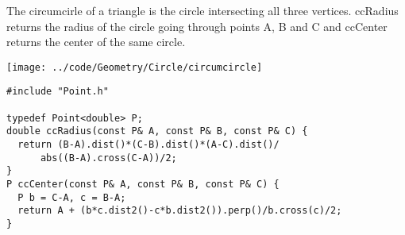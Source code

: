 \begin{minipage}{75mm}
The circumcirle of a triangle is the circle intersecting all three vertices. ccRadius returns the radius of the circle going through points A, B and C and ccCenter returns the center of the same circle.
\end{minipage}
\begin{minipage}{15mm}
\vspace{-2mm}
\texttt{[image: ../code/Geometry/Circle/circumcircle]}
\end{minipage}
\begin{verbatim}
#include "Point.h"

typedef Point<double> P;
double ccRadius(const P& A, const P& B, const P& C) {
  return (B-A).dist()*(C-B).dist()*(A-C).dist()/
      abs((B-A).cross(C-A))/2;
}
P ccCenter(const P& A, const P& B, const P& C) {
  P b = C-A, c = B-A;
  return A + (b*c.dist2()-c*b.dist2()).perp()/b.cross(c)/2;
}
\end{verbatim}